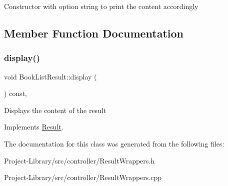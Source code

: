 Constructor with option string to print the content accordingly 

\subsection{Member Function Documentation}
\mbox{\label{classBookListResult_afecd81f393580cf102e694796d6d3ab7}} 
\subsubsection{\texorpdfstring{display()}{display()}}
{\footnotesize\ttfamily void Book\+List\+Result\+::display (\begin{DoxyParamCaption}{ }\end{DoxyParamCaption}) const\hspace{0.3cm}{\ttfamily [override]}, {\ttfamily [virtual]}}

Displays the content of the result 

Implements \hyperlink{classResult_a625729bae46b53c231feb50a91b1390e}{Result}.



The documentation for this class was generated from the following files\+:\begin{DoxyCompactItemize}
\item 
Project-\/\+Library/src/controller/Result\+Wrappers.\+h\item 
Project-\/\+Library/src/controller/Result\+Wrappers.\+cpp\end{DoxyCompactItemize}
